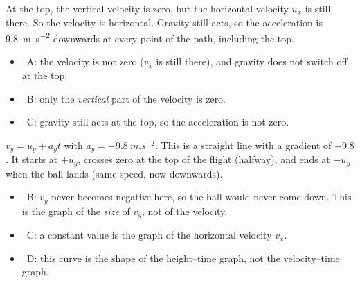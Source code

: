 \begin{practiceanswers}

\begin{practiceans}
  At the top, the vertical velocity is zero, but the horizontal velocity $u_x$ is still
  there. So the velocity is horizontal. Gravity still acts, so the acceleration is
  \qty{9.8}{m.s^{-2}} downwards at every point of the path, including the top.
  \begin{itemize}
    \item \xmark\ A: the velocity is not zero ($v_x$ is still there), and gravity does not
          switch off at the top.
    \item \xmark\ B: only the \emph{vertical} part of the velocity is zero.
    \item \xmark\ C: gravity still acts at the top, so the acceleration is not zero.
  \end{itemize}
\end{practiceans}

\begin{practiceans}
  $v_y = u_y + a_y t$ with $a_y = \qty{-9.8}{m.s^{-2}}$. This is a straight line with a
  gradient of $-9.8$. It starts at $+u_y$, crosses zero at the top of the flight (halfway),
  and ends at $-u_y$ when the ball lands (same speed, now downwards).
  \begin{itemize}
    \item \xmark\ B: $v_y$ never becomes negative here, so the ball would never come down. This is
          the graph of the \emph{size} of $v_y$, not of the velocity.
    \item \xmark\ C: a constant value is the graph of the horizontal velocity $v_x$.
    \item \xmark\ D: this curve is the shape of the height--time graph, not the velocity--time
          graph.
  \end{itemize}
\end{practiceans}


\end{practiceanswers}
